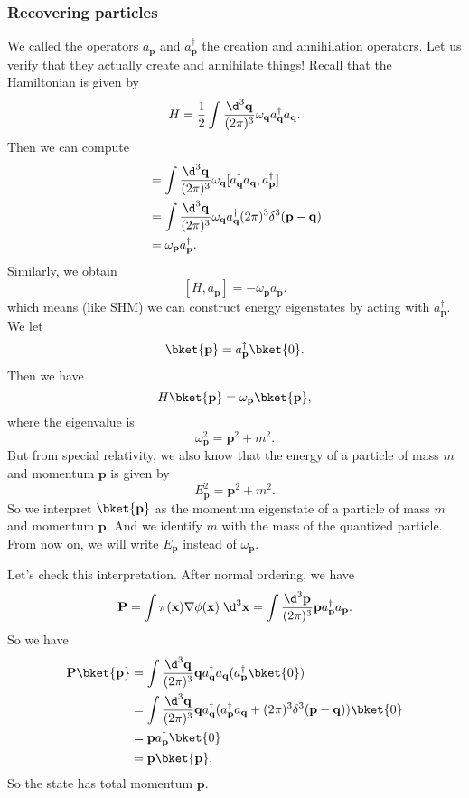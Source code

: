 \documentclass[a4paper]{article}
\begin{document}
\subsubsection*{Recovering particles}
We called the operators $a_\mathbf{p}$ and $a_\mathbf{p}^\dagger$ the creation and annihilation operators. Let us verify that they actually create and annihilate things! Recall that the Hamiltonian is given by
\[
  H = \frac{1}{2} \int \frac{\d^3 \mathbf{q}}{(2\pi)^3} \omega_\mathbf{q} a_\mathbf{q}^\dagger a_\mathbf{q}.
\]
Then we can compute
\begin{align*}
  [H, a_\mathbf{p}^\dagger] &= \int \frac{\d^3 \mathbf{q}}{(2\pi)^3} \omega_\mathbf{q} [a_\mathbf{q}^\dagger a_\mathbf{q}, a_\mathbf{p}^\dagger]\\
  &= \int \frac{\d^3 \mathbf{q}}{(2\pi)^3} \omega_\mathbf{q} a_\mathbf{q}^\dagger (2\pi)^3 \delta^3(\mathbf{p} - \mathbf{q})\\
  &= \omega_\mathbf{p} a_\mathbf{p}^\dagger.
\end{align*}
Similarly, we obtain
\[
  [H, a_\mathbf{p}] = - \omega_\mathbf{p} a_\mathbf{p}.
\]
which means (like SHM) we can construct energy eigenstates by acting with $a_\mathbf{p}^\dagger$. We let
\[
  \bket{\mathbf{p}} = a_\mathbf{p}^\dagger \bket{0}.
\]
Then we have
\[
  H\bket{\mathbf{p}} = \omega_\mathbf{p} \bket{\mathbf{p}},
\]
where the eigenvalue is
\[
  \omega_\mathbf{p}^2 = \mathbf{p}^2 + m^2.
\]
But from special relativity, we also know that the energy of a particle of mass $m$ and momentum $\mathbf{p}$ is given by
\[
  E_\mathbf{p}^2 = \mathbf{p}^2 + m^2.
\]
So we interpret $\bket{\mathbf{p}}$ as the momentum eigenstate of a particle of mass $m$ and momentum $\mathbf{p}$. And we identify $m$ with the mass of the quantized particle. From now on, we will write $E_\mathbf{p}$ instead of $\omega_\mathbf{p}$.

Let's check this interpretation. After normal ordering, we have
\[
  \mathbf{P} = \int \pi(\mathbf{x}) \nabla \phi(\mathbf{x}) \;\d^3 \mathbf{x} = \int \frac{\d^3 \mathbf{p}}{(2\pi)^3} \mathbf{p} a_\mathbf{p}^\dagger a_\mathbf{p}.
\]
So we have
\begin{align*}
  \mathbf{P}\bket{\mathbf{p}} &= \int \frac{\d^3 \mathbf{q}}{(2\pi)^3} \mathbf{q} a_\mathbf{q}^\dagger a_\mathbf{q}(a_\mathbf{p}^\dagger \bket{0})\\
  &= \int \frac{\d^3 \mathbf{q}}{(2\pi)^3} \mathbf{q} a_\mathbf{q}^\dagger (a_\mathbf{p}^\dagger a_\mathbf{q} + (2\pi)^3 \delta^3(\mathbf{p} - \mathbf{q}))\bket{0}\\
  &= \mathbf{p}a_\mathbf{p}^\dagger \bket{0}\\
  &= \mathbf{p}\bket{\mathbf{p}}.
\end{align*}
So the state has total momentum $\mathbf{p}$.
\end{document}
